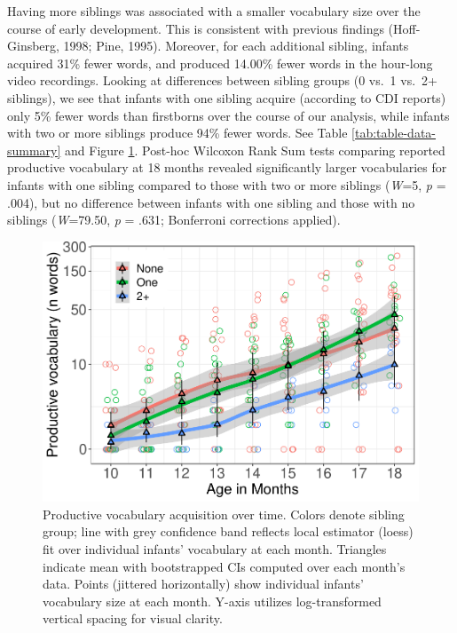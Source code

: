 \documentclass[
  english,
  man,floatsintext]{apa6}
\begin{document}
Having more siblings was associated with a smaller vocabulary size over the course of early development. This is consistent with previous findings (Hoff-Ginsberg, 1998; Pine, 1995). Moreover, for each additional sibling, infants acquired 31\% fewer words, and produced 14.00\% fewer words in the hour-long video recordings. Looking at differences between sibling groups (0 vs.~1 vs.~2+ siblings), we see that infants with one sibling acquire (according to CDI reports) only 5\% fewer words than firstborns over the course of our analysis, while infants with two or more siblings produce 94\% fewer words. See Table \ref{tab:table-data-summary} and Figure \ref{fig:Figure-SibGroup}. Post-hoc Wilcoxon Rank Sum tests comparing reported productive vocabulary at 18 months revealed significantly larger vocabularies for infants with one sibling compared to those with two or more siblings (\emph{W}=5, \emph{p} = .004), but no difference between infants with one sibling and those with no siblings (\emph{W}=79.50, \emph{p} = .631; Bonferroni corrections applied).

\begin{figure}
\centering
\includegraphics{SiblingsStudyText_files/figure-latex/Figure-SibGroup-1.pdf}
\caption{\label{fig:Figure-SibGroup}Productive vocabulary acquisition over time. Colors denote sibling group; line with grey confidence band reflects local estimator (loess) fit over individual infants' vocabulary at each month. Triangles indicate mean with bootstrapped CIs computed over each month's data. Points (jittered horizontally) show individual infants' vocabulary size at each month. Y-axis utilizes log-transformed vertical spacing for visual clarity.}
\end{figure}
\end{document}
